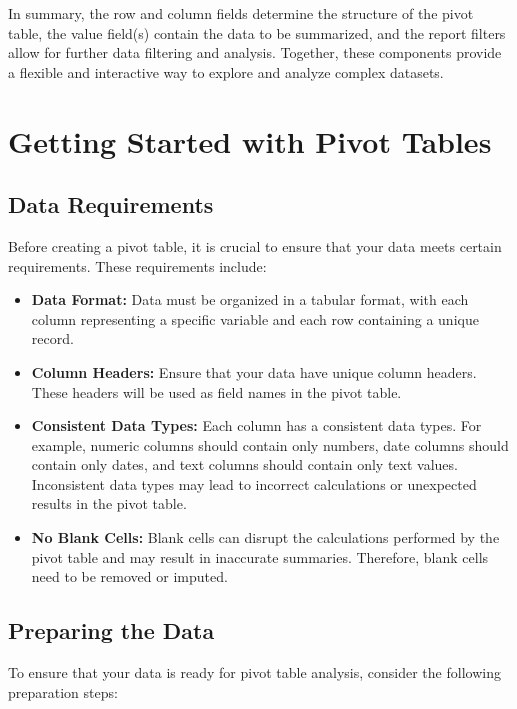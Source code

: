 \documentclass[
]{book}
\providecommand{\tightlist}{%
  \setlength{\itemsep}{0pt}\setlength{\parskip}{0pt}}
\begin{document}
In summary, the row and column fields determine the structure of the pivot table, the value field(s) contain the data to be summarized, and the report filters allow for further data filtering and analysis. Together, these components provide a flexible and interactive way to explore and analyze complex datasets.

\hypertarget{getting-started-with-pivot-tables}{%
\chapter{Getting Started with Pivot Tables}\label{getting-started-with-pivot-tables}}

\hypertarget{data-requirements}{%
\section{Data Requirements}\label{data-requirements}}

Before creating a pivot table, it is crucial to ensure that your data meets certain requirements. These requirements include:

\begin{itemize}
\tightlist
\item
  \textbf{Data Format:} Data must be organized in a tabular format, with each column representing a specific variable and each row containing a unique record.
\item
  \textbf{Column Headers:} Ensure that your data have unique column headers. These headers will be used as field names in the pivot table.
\item
  \textbf{Consistent Data Types:} Each column has a consistent data types. For example, numeric columns should contain only numbers, date columns should contain only dates, and text columns should contain only text values. Inconsistent data types may lead to incorrect calculations or unexpected results in the pivot table.
\item
  \textbf{No Blank Cells:} Blank cells can disrupt the calculations performed by the pivot table and may result in inaccurate summaries. Therefore, blank cells need to be removed or imputed.
\end{itemize}

\hypertarget{preparing-the-data}{%
\section{Preparing the Data}\label{preparing-the-data}}

To ensure that your data is ready for pivot table analysis, consider the following preparation steps:
\end{document}
